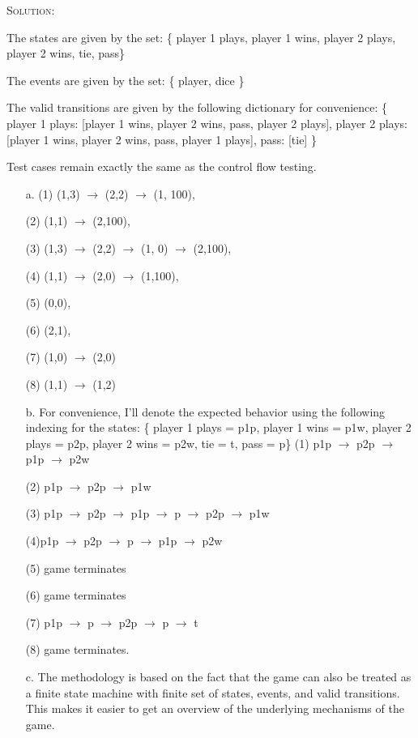 \documentclass{exam}
\newenvironment{sol}{
  \medskip

  \textsc{Solution:}
}
{
  \medskip

}
\begin{document}
\begin{questions}

 \begin{sol}
\color{blue} The states are given by the set: \{ player 1 plays, player 1 wins, player 2 plays, player 2 wins, tie, pass\}

The events are given by the set: \{ player, dice \} 

The valid transitions are given by the following dictionary for convenience: \{ player 1 plays: [player 1 wins, player 2 wins, pass, player 2 plays], player 2 plays: [player 1 wins, player 2 wins, pass, player 1 plays], pass: [tie] \}

Test cases remain exactly the same as the control flow testing. 

\begin{enumerate}
\item[a.] (1)  (1,3) $\to$  (2,2) $\to$ (1, 100), 

(2) (1,1) $\to$ (2,100),

(3) (1,3) $\to$  (2,2) $\to$ (1, 0) $\to$ (2,100), 

(4) (1,1) $\to$ (2,0) $\to$ (1,100), 

(5) (0,0), 

(6) (2,1), 

(7) (1,0) $\to$ (2,0)

(8) (1,1) $\to$ (1,2)
\item [b.] For convenience, I'll denote the expected behavior using the following indexing for the states: \{ player 1 plays = p1p, player 1 wins = p1w, player 2 plays = p2p, player 2 wins = p2w, tie = t, pass = p\}
(1) p1p $\to$ p2p $\to$ p1p $\to$ p2w

(2) p1p $\to$ p2p $\to$ p1w

(3) p1p $\to$ p2p $\to$ p1p $\to$ p $\to$ p2p $\to$ p1w

(4)p1p $\to$ p2p $\to$ p $\to$ p1p $\to$ p2w

(5) game terminates

(6) game terminates

(7) p1p $\to$ p $\to$ p2p $\to$ p $\to$ t

(8) game terminates.

\item [c.] The methodology is based on the fact that the game can also be treated as a finite state machine with finite set of states, events, and valid transitions. This makes it easier to get an overview of the underlying mechanisms of the game.


\end{enumerate}
\end{sol}
\end{questions}
\end{document}
